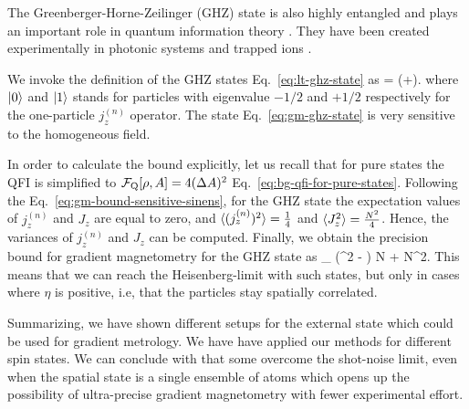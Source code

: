 
The Greenberger-Horne-Zeilinger (GHZ) state is also highly entangled and plays an important role in quantum information theory \cite{Greenberger1990}.
They have been created experimentally in photonic systems \cite{Pan2000,Yao2012,Lu2007} and trapped ions \cite{Sackett2000,Monz2011}.

We invoke the definition of the GHZ states Eq.~\eqref{eq:lt-ghz-state} as
\be
  \ket{\ghz} = (+).
  \label{eq:gm-ghz-state}
\ee
where $\vert{0}\rangle$ and $\vert{1}\rangle$ stands for particles with eigenvalue $-1/2$ and $+1/2$ respectively for the one-particle $j_z^{(n)}$ operator.
The state Eq.~\eqref{eq:gm-ghz-state} is very sensitive to the homogeneous field.

In order to calculate the bound explicitly, let us recall that for pure states the QFI is simplified to $\mathcal{F}_{\textnormal{Q}}[{\textstyle \rho,A}]=4(\Delta A )^2$ Eq.~\eqref{eq:bg-qfi-for-pure-states}.
Following the Eq.~\eqref{eq:gm-bound-sensitive-sinens}, for the GHZ state the expectation values of $j_z^{(n)}$ and $J_z$ are equal to zero, and $\langle{(j_z^{(n)})^2}\rangle=\frac{1}{4}$ and $\langle{J_z^2}\rangle = \frac{N^2}{4}$.
Hence, the variances of $j_z^{(n)}$ and $J_z$ can be computed.
Finally, we obtain the precision bound for gradient magnetometry for the GHZ state as
\be
\label{eq:gm-precision bound for ghz}
_{\ghz} \leqslant (\sigma^2 - \eta) N  + \eta N^2.
\ee
This means that we can reach the Heisenberg-limit with such states, but only in
cases where $\eta$ is positive, i.e, that the particles stay spatially correlated.

Summarizing, we have shown different setups for the external state which could be used for gradient metrology.
We have have applied our methods for different spin states.
We can conclude with that some overcome the shot-noise limit, even when the spatial state is a single ensemble of atoms which opens up the possibility of ultra-precise gradient magnetometry with fewer experimental effort.

